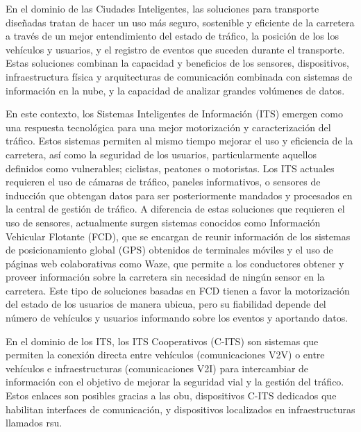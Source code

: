En el dominio de las Ciudades Inteligentes, las soluciones para transporte diseñadas tratan
de hacer un uso más seguro, sostenible y eficiente de la carretera a través de un mejor
entendimiento del estado de tráfico, la posición de los los vehículos y usuarios, y el
registro de eventos que suceden durante el transporte. Estas soluciones combinan la capacidad
y beneficios de los sensores, dispositivos, infraestructura física y arquitecturas de
comunicación combinada con sistemas de información en la nube, y la capacidad de analizar
grandes volúmenes de datos.

En este contexto, los Sistemas Inteligentes de Información (ITS) emergen como una respuesta
tecnológica para una mejor motorización y caracterización del tráfico. Estos sistemas
permiten al mismo tiempo mejorar el uso y eficiencia de la carretera, así como la seguridad
de los usuarios, particularmente aquellos definidos como vulnerables; ciclistas, peatones o
motoristas. Los ITS actuales requieren el uso de cámaras de tráfico, paneles informativos,
o sensores de inducción que obtengan datos para ser posteriormente mandados y procesados en
la central de gestión de tráfico. A diferencia de estas soluciones que requieren el uso de
sensores, actualmente surgen sistemas conocidos como Información Vehicular Flotante (FCD),
que se encargan de reunir información de los sistemas de posicionamiento global (GPS) obtenidos
de terminales móviles y el uso de páginas web colaborativas como Waze, que permite a los
conductores obtener y proveer información sobre la carretera sin necesidad de ningún sensor
en la carretera. Este tipo de soluciones basadas en FCD tienen a favor la motorización del
estado de los usuarios de manera ubicua, pero su fiabilidad depende del número de vehículos y
usuarios informando sobre los eventos y aportando datos.

En el dominio de los ITS, los ITS Cooperativos (C-ITS) son sistemas que permiten la conexión
directa entre vehículos (comunicaciones V2V) o entre vehículos e infraestructuras
(comunicaciones V2I) para intercambiar de información con el objetivo de mejorar la seguridad
vial y la gestión del tráfico. Estos enlaces son posibles gracias a las \gls{obu}, dispositivos
C-ITS dedicados que habilitan interfaces de comunicación, y dispositivos localizados en
infraestructuras llamados \gls{rsu}.

